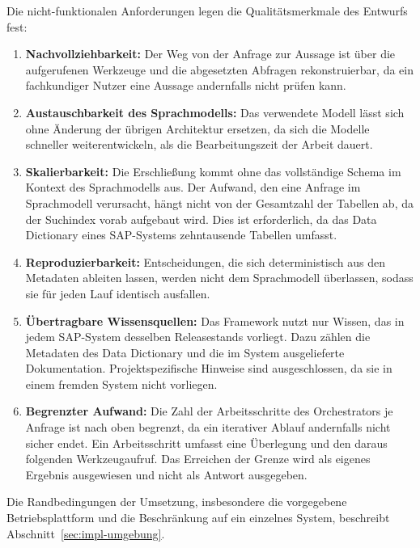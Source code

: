 Die nicht-funktionalen Anforderungen legen die Qualitätsmerkmale des Entwurfs fest:
\begin{enumerate}
	\item[\textbf{NFA1}] \textbf{Nachvollziehbarkeit:} Der Weg von der Anfrage zur Aussage ist über die aufgerufenen Werkzeuge und die abgesetzten Abfragen rekonstruierbar, da ein fachkundiger Nutzer eine Aussage andernfalls nicht prüfen kann.
	\item[\textbf{NFA2}] \textbf{Austauschbarkeit des Sprachmodells:} Das verwendete Modell lässt sich ohne Änderung der übrigen Architektur ersetzen, da sich die Modelle schneller weiterentwickeln, als die Bearbeitungszeit der Arbeit dauert.
	\item[\textbf{NFA3}] \textbf{Skalierbarkeit:} Die Erschließung kommt ohne das vollständige Schema im Kontext des Sprachmodells aus. Der Aufwand, den eine Anfrage im Sprachmodell verursacht, hängt nicht von der Gesamtzahl der Tabellen ab, da der Suchindex vorab aufgebaut wird. Dies ist erforderlich, da das Data Dictionary eines SAP-Systems zehntausende Tabellen umfasst.
	\item[\textbf{NFA4}] \textbf{Reproduzierbarkeit:} Entscheidungen, die sich deterministisch aus den Metadaten ableiten lassen, werden nicht dem Sprachmodell überlassen, sodass sie für jeden Lauf identisch ausfallen.
	\item[\textbf{NFA5}] \textbf{Übertragbare Wissensquellen:} Das Framework nutzt nur Wissen, das in jedem SAP-System desselben Releasestands vorliegt. Dazu zählen die Metadaten des Data Dictionary und die im System ausgelieferte Dokumentation. Projektspezifische Hinweise sind ausgeschlossen, da sie in einem fremden System nicht vorliegen.
	\item[\textbf{NFA6}] \textbf{Begrenzter Aufwand:} Die Zahl der Arbeitsschritte des Orchestrators je Anfrage ist nach oben begrenzt, da ein iterativer Ablauf andernfalls nicht sicher endet. Ein Arbeitsschritt umfasst eine Überlegung und den daraus folgenden Werkzeugaufruf. Das Erreichen der Grenze wird als eigenes Ergebnis ausgewiesen und nicht als Antwort ausgegeben.
\end{enumerate}


Die Randbedingungen der Umsetzung, insbesondere die vorgegebene Betriebsplattform und die Beschränkung auf ein einzelnes System, beschreibt Abschnitt~\ref{sec:impl-umgebung}.

